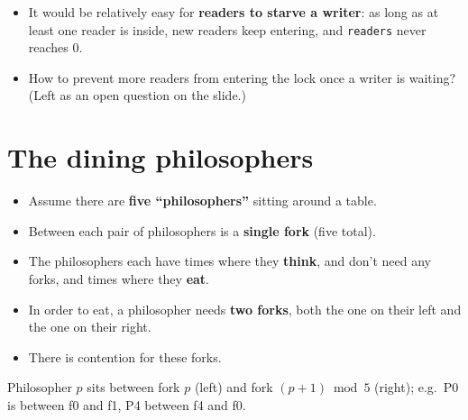 \documentclass[11pt,a4paper]{article}
\begin{document}
\begin{warnbox}
\begin{itemize}
  \item It would be relatively easy for \textbf{readers to starve a
        writer}: as long as at least one reader is inside, new readers keep
        entering, and \texttt{readers} never reaches 0.
  \item How to prevent more readers from entering the lock once a writer is
        waiting? (Left as an open question on the slide.)
\end{itemize}
\end{warnbox}

\section{The dining philosophers}

\begin{itemize}
  \item Assume there are \textbf{five ``philosophers''} sitting around a
        table.
  \item Between each pair of philosophers is a \textbf{single fork} (five
        total).
  \item The philosophers each have times where they \textbf{think}, and
        don't need any forks, and times where they \textbf{eat}.
  \item In order to eat, a philosopher needs \textbf{two forks}, both the
        one on their left and the one on their right.
  \item There is contention for these forks.
\end{itemize}

\begin{center}
\end{center}

Philosopher \(p\) sits between fork \(p\) (left) and fork \((p+1) \bmod 5\)
(right); e.g.\ P0 is between f0 and f1, P4 between f4 and f0.
\end{document}
